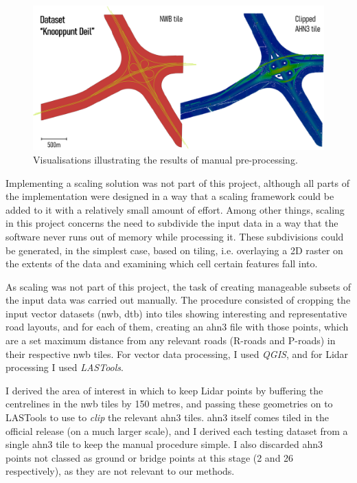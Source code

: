 \begin{figure}
    \centering
    \includegraphics[width=\linewidth]{final_report/figs/manualpreprocessing.png}
    \caption{Visualisations illustrating the results of manual pre-processing.}
    \label{fig:manualpreprocessing}
\end{figure}

Implementing a scaling solution was not part of this project, although all parts of the implementation were designed in a way that a scaling framework could be added to it with a relatively small amount of effort. Among other things, scaling in this project concerns the need to subdivide the input data in a way that the software never runs out of memory while processing it. These subdivisions could be generated, in the simplest case, based on tiling, i.e. overlaying a 2D raster on the extents of the data and examining which cell certain features fall into.

As scaling was not part of this project, the task of creating manageable subsets of the input data was carried out manually. The procedure consisted of cropping the input vector datasets (\ac{nwb}, \ac{dtb}) into tiles showing interesting and representative road layouts, and for each of them, creating an \ac{ahn3} file with those points, which are a set maximum distance from any relevant roads (R-roads and P-roads) in their respective \ac{nwb} tiles. For vector data processing, I used \textit{QGIS}, and for Lidar processing I used \textit{LASTools}.

I derived the area of interest in which to keep Lidar points by buffering the centrelines in the \ac{nwb} tiles by 150 metres, and passing these geometries on to LASTools to use to \textit{clip} the relevant \ac{ahn3} tiles. \ac{ahn3} itself comes tiled in the official release (on a much larger scale), and I derived each testing dataset from a single \ac{ahn3} tile to keep the manual procedure simple. I also discarded \ac{ahn3} points not classed as ground or bridge points at this stage (2 and 26 respectively), as they are not relevant to our methods.

